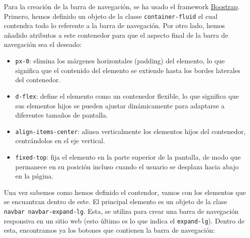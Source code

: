 \documentclass{article}
\begin{document}
\noindent Para la creación de la barra de navegación, se ha usado el framework \href{https://getbootstrap.com/}{Boostrap}. Primero, hemos definido un objeto de la classe \texttt{container-fluid} el cual contendra todo lo referente a la barra de navegación. Por otro lado, hemos añadido atributos a este contenedor para que el aspecto final de la barra de navegación sea el deseado:
\begin{itemize}
    \item \texttt{px-0}: elimina los márgenes horizontales (padding) del elemento, lo que significa que el contenido del elemento se extiende hasta los bordes laterales del contenedor.
    \item \texttt{d-flex}: define el elemento como un contenedor flexible, lo que significa que sus elementos hijos se pueden ajustar dinámicamente para adaptarse a diferentes tamaños de pantalla.
    \item \texttt{align-items-center}: alinea verticalmente los elementos hijos del contenedor, centrándolos en el eje vertical.
    \item \texttt{fixed-top}: fija el elemento en la parte superior de la pantalla, de modo que permanece en su posición incluso cuando el usuario se desplaza hacia abajo en la página.
\end{itemize}
Una vez sabemos como hemos definido el contendor, vamos con los elementos que se encuantran dentro de este. El principal elemento es un objeto de la clase \texttt{navbar navbar-expand-lg}. Esta, se utiliza para crear una barra de navegación responsiva en un sitio web (esto último es lo que indica el \texttt{expand-lg}). Dentro de esta, encontramos ya los botones que contienen la barra de navegación:
\end{document}
